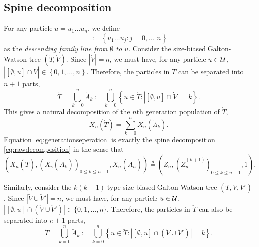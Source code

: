 \documentclass[12pt]{amsart}
\numberwithin{equation}{section}
\newcommand{\defn}[1]{{\em #1}}
\newcommand{\abs}[1]{\left| #1 \right|}
\newcommand{\expr}[1]{\left( #1 \right)}
\newcommand{\set}[1]{\left\{ #1 \right\}}
\newcommand{\ancestor}[1]{[\emptyset,#1]}
\newcommand{\eqlaw}{\overset{d}{=}}
\begin{document}
\subsection{Spine decomposition}
\label{sec:spinesdecomposition}
	For any particle 
	$u=u_1\dots u_n$,  
	we define
\begin{equation*}
	    \ancestor{u}
	:=
	    \set{u_1\dots u_j:j=0,\dots, n}
\end{equation*}
	as the \defn{descending family line from $\emptyset$ to $u$}. 
	Consider the size-biased Galton-Watson tree $(\dot T,\dot V)$. 
	Since $|\dot V|=n$, we must have, for any particle $u\in\mathcal U$, %
	$|\ancestor{u}\cap\dot V|\in\set{0,1,\dots,n}$. 
	Therefore, the particles in $\dot T$ can be separated into $n+1$ parts,
\begin{equation*}
		\dot T
	=
		\bigcup_{k=0}^n\dot A_k
	:=
	    \bigcup_{k=0}^n\set{u\in\dot T:\abs{\ancestor{u}\cap \dot V}=k}.
\end{equation*}
	This gives a natural decomposition of the $n$th generation population of $\dot T$,
\begin{equation}
\label{eq:generationseperation}
		X_n(\dot T)
	=
		\sum_{k=0}^nX_n(\dot A_k).
\end{equation}
	Equation \eqref{eq:generationseperation} is exactly the spine decomposition \eqref{eq:rawdecomposition} in the sense that
\begin{equation*}
        \expr{X_n(\dot T),(X_n(\dot A_k))_{0\le k\le n-1},X_n(\dot A_n)}
    \eqlaw
        \expr{\dot Z_n,(\dot Z_n^{(k+1)})_{0\le k\le n-1},1}.
\end{equation*}
\par
	Similarly, consider the $k(k-1)$-type size-biased Galton-Watson tree $(\ddot T,\ddot V,\ddot V')$. 
	Since $|\ddot V\cup\ddot V'|=n$, we must have, for any particle $u\in\mathcal U$, $|\ancestor{u}\cap(\ddot V\cup \ddot V')|\in\{0,1,\dots,n\}$. 
	Therefore, the particles in $\ddot T$ can also be separated into $n+1$ parts,
\begin{equation*}
		\ddot T
	=
		\bigcup_{k=0}^n \ddot A_k
	:=
		\bigcup_{k=0}^n\set{u\in\ddot T: \abs{\ancestor{u}\cap(\ddot V\cup\ddot V')}=k}.
\end{equation*}
\end{document}
